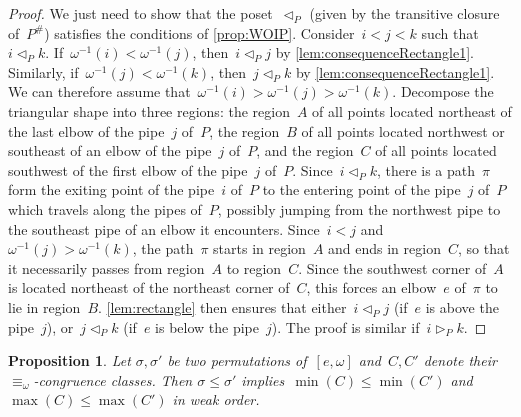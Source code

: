 \documentclass{amsart}
\newtheorem{proposition}[theorem]{Proposition}
\theoremstyle{definition}
\newcommand{\contact}{^\#} %
\newcommand{\less}{\vartriangleleft} %
\newcommand{\more}{\vartriangleright} %
\newcommand{\contactLess}[1]{\less_{#1}} %
\newcommand{\contactMore}[1]{\more_{#1}} %
\begin{document}
\begin{proof}
We just need to show that the poset~$\contactLess{P}$ (given by the transitive closure of~$P\contact$) satisfies the conditions of \cref{prop:WOIP}.
Consider~$i < j < k$ such that~$i \contactLess{P} k$.
If~$\omega^{-1}(i) < \omega^{-1}(j)$, then~$i \contactLess{P} j$ by \cref{lem:consequenceRectangle1}.
Similarly, if~$\omega^{-1}(j) < \omega^{-1}(k)$, then~$j \contactLess{P} k$ by \cref{lem:consequenceRectangle1}.
We can therefore assume that~$\omega^{-1}(i) > \omega^{-1}(j) > \omega^{-1}(k)$.
Decompose the triangular shape into three regions: the region~$A$ of all points located northeast of the last elbow of the pipe~$j$ of~$P$, the region~$B$ of all points located northwest or southeast of an elbow of the pipe~$j$ of~$P$, and the region~$C$ of all points located southwest of the first elbow of the pipe~$j$ of~$P$.
Since~$i \contactLess{P} k$, there is a path~$\pi$ form the exiting point of the pipe~$i$ of~$P$ to the entering point of the pipe~$j$ of~$P$ which travels along the pipes of~$P$, possibly jumping from the northwest pipe to the southeast pipe of an elbow it encounters.
Since~$i < j$ and~$\omega^{-1}(j) > \omega^{-1}(k)$, the path~$\pi$ starts in region~$A$ and ends in region~$C$, so that it necessarily passes from region~$A$ to region~$C$.
Since the southwest corner of~$A$ is located northeast of the northeast corner of~$C$, this forces an elbow~$e$ of~$\pi$ to lie in region~$B$.
\cref{lem:rectangle} then ensures that either~$i \contactLess{P} j$ (if~$e$ is above the pipe~$j$), or~$j \contactLess{P} k$ (if~$e$ is below the pipe~$j$).
The proof is similar if~$i \contactMore{P} k$.
\end{proof}

\begin{proposition}
\label{prop:orderPreserving}
Let $\sigma, \sigma'$ be two permutations of~$[e, \omega]$ and~$C, C'$ denote their $\equiv_\omega$-congruence classes.
Then $\sigma \le \sigma'$ implies~$\min(C) \le \min(C')$ and $\max(C) \le \max(C')$ in weak order.
\end{proposition}
\end{document}
